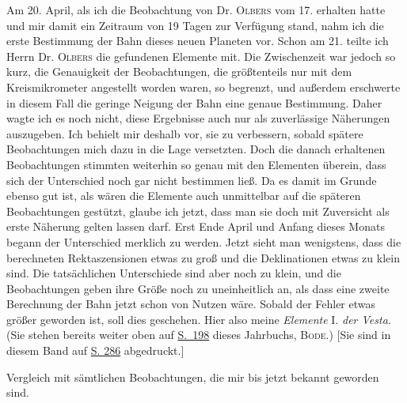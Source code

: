 \par\indent Am 20. April, als ich die Beobachtung von Dr. \textsc{Olbers} vom 17. erhalten hatte und mir damit ein Zeitraum von 19 Tagen zur Verfügung stand, nahm ich die erste Bestimmung der Bahn dieses neuen Planeten vor. Schon am 21. teilte ich Herrn Dr. \textsc{Olbers} die gefundenen Elemente mit. Die Zwischenzeit war jedoch so kurz, die Genauigkeit der Beobachtungen, die größtenteils nur mit dem Kreismikrometer angestellt worden waren, so begrenzt, und außerdem erschwerte in diesem Fall die geringe Neigung der Bahn eine genaue Bestimmung. Daher wagte ich es noch nicht, diese Ergebnisse auch nur als zuverlässige Näherungen auszugeben. Ich behielt mir deshalb vor, sie zu verbessern, sobald spätere Beobachtungen mich dazu in die Lage versetzten. Doch die danach erhaltenen Beobachtungen stimmten weiterhin so genau mit den Elementen überein, dass sich der Unterschied noch gar nicht bestimmen ließ. Da es damit im Grunde ebenso gut ist, als wären die Elemente auch unmittelbar auf die späteren Beobachtungen gestützt, glaube ich jetzt, dass man sie doch mit Zuversicht als erste Näherung gelten lassen darf. Erst Ende April und Anfang dieses Monats begann der Unterschied merklich zu werden. Jetzt sieht man wenigstens, dass die berechneten Rektaszensionen etwas zu groß und die Deklinationen etwas zu klein sind. Die tatsächlichen Unterschiede sind aber noch zu klein, und die Beobachtungen geben ihre Größe noch zu uneinheitlich an, als dass eine zweite Berechnung der Bahn jetzt schon von Nutzen wäre. Sobald der Fehler etwas größer geworden ist, soll dies geschehen. Hier also meine \emph{Elemente} I. \emph{der Vesta.} (Sie stehen bereits weiter oben auf \href{https://www.digitale-sammlungen.de/en/view/bsb10538339?page=208}{S.~198} dieses Jahrbuchs, \textsc{Bode}.) [Sie sind in diesem Band auf \hyperlink{vesta1807-first-elements}{S. 286} abgedruckt.]
\par\Needspace{70pt}
%
\par\medskip\noindent Vergleich mit sämtlichen Beobachtungen, die mir bis jetzt bekannt geworden sind.

